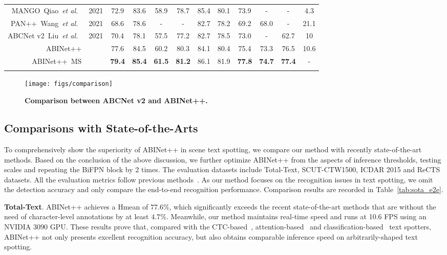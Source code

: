 \documentclass[10pt,journal,compsoc]{IEEEtran}
\def\etal{{\it et al.}\xspace}
\newlength\savedwidth
\newcommand\whline{\noalign{\global\savedwidth\arrayrulewidth
                           \global\arrayrulewidth 0.8pt}\hline
                  \noalign{\global\arrayrulewidth\savedwidth}}
\begin{document}
\begin{table*}[!t]
{\begin{tabular}{ r |c|cc|cc|cccc|c|c}
     MANGO~Qiao~\etal~\cite{qiao2021mango} & 2021& 72.9&83.6 &58.9&78.7 &85.4&80.1&73.9&- &- &4.3\\ PAN++~Wang~\etal~\cite{wang2021pan++} & 2021& 68.6&78.6 &-&- &82.7&78.2&69.2&68.0 &- &21.1 \\
     ABCNet v2~Liu~\etal~\cite{liu2020abcnetv2} & 2021 &70.4&78.1  &57.5&77.2 &82.7&78.5&73.0&-  &62.7 &10\\
     \hline
     ABINet++ & &77.6&84.5 &60.2&80.3 &84.1&80.4&75.4&73.3 &76.5 &10.6\\
     ABINet++~MS & &\bf{79.4}&\bf{85.4} &\bf{61.5}&\bf{81.2} &86.1&81.9&\bf{77.8}&\bf{74.7} &\bf{77.4} & -\\
     \whline
   \end{tabular}}
   \vspace{-2em}
 \end{table*}
 
 \begin{figure}
   \begin{center}
      \texttt{[image: figs/comparison]}
      \caption{\textbf{Comparison between ABCNet v2 and ABINet++.}}
      \label{fig:comparison}
   \end{center}
   \vspace{-1.5em}
 \end{figure}


\subsection{Comparisons with State-of-the-Arts}



To comprehensively show the superiority of ABINet++ in scene text spotting, we compare our method with recently state-of-the-art methods. Based on the conclusion of the above discussion, we further optimize ABINet++ from the aspects of inference thresholds, testing scales and repeating the BiFPN block by 2 times. The evaluation datasets include Total-Text, SCUT-CTW1500, ICDAR 2015 and ReCTS datasets. All the evaluation metrics follow previous methods~\cite{liu2020abcnetv2,wang2021pan++,liao2019mask}. As our method focuses on the recognition issues in text spotting, we omit the detection accuracy and only compare the end-to-end recognition performance. Comparison results are recorded in Table~\ref{tab:sota_e2e}.

\textbf{Total-Text}. ABINet++ achieves a Hmean of $77.6\%$, which significantly exceeds the recent state-of-the-art methods that are without the need of character-level annotations by at least $4.7\%$. Meanwhile, our method maintains real-time speed and runs at 10.6 FPS using an NVIDIA 3090 GPU. These results prove that, compared with the CTC-based~\cite{liu2020abcnet, wang2021pgnet}, attention-based~\cite{liu2020abcnetv2,wang2021pan++} and classification-based~\cite{qiao2021mango} text spotters, ABINet++ not only presents excellent recognition accuracy, but also obtains comparable inference speed on arbitrarily-shaped text spotting.
\end{document}

